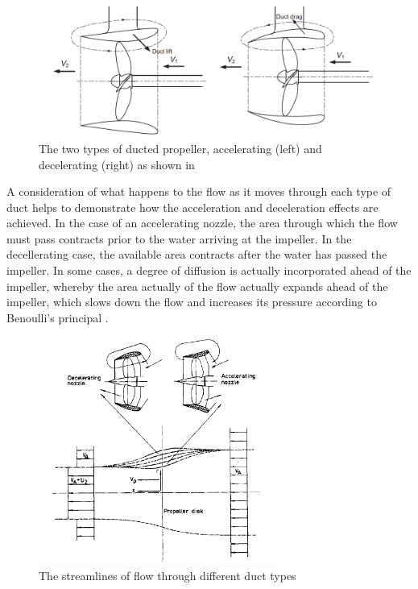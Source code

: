 \documentclass{article}\usepackage[]{graphicx}\usepackage[]{color}
\begin{document}
\begin{figure}[h]
\captionsetup{width=\textwidth}
\includegraphics[width=\textwidth]{AccelDecel.png}
\caption{The two types of ducted propeller, accelerating (left) and decelerating (right) as shown in \parencite[249]{mollard2011}}
\label{fig:AccelDecel.png}
\end{figure}

A consideration of what happens to the flow as it moves through each type of duct helps to demonstrate how the acceleration and deceleration effects are achieved. In the case of an accelerating nozzle, the area through which the flow must pass contracts prior to the water arriving at the impeller.  In the decellerating case, the available area contracts after the water has passed the impeller. In some cases, a degree of diffusion is actually incorporated ahead of the impeller, whereby the area actually of the flow actually expands ahead of the impeller, which slows down the flow and increases its pressure according to Benoulli's principal \parencite{wislicenus1973}.

\begin{figure}[h]
\captionsetup{width=0.7\textwidth}
\includegraphics[width=0.7\textwidth, center]{DuctStreamlines.png}
\caption{The streamlines of flow through different duct types \parencite[214]{lewis1988}}
\label{fig:DuctStreamlines.png}
\end{figure}
\end{document}
